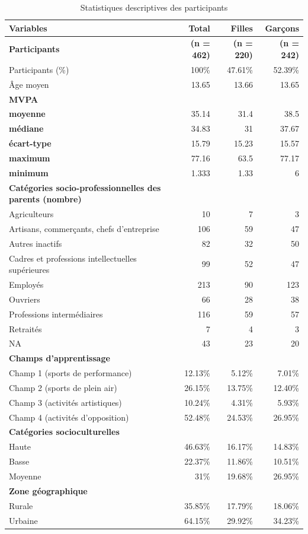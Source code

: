 \documentclass[12pt,a4paper]{article}
\begin{document}
\begin{table}[H]
	\centering
	\caption{Statistiques descriptives des participants}
	\begin{tabular}{lrrr}
		\toprule
		\textbf{Variables} & \textbf{Total} & \textbf{Filles} & \textbf{Garçons} \\
		\midrule
		\textbf{Participants} & \textbf{(n = 462)} & \textbf{(n = 220)} & \textbf{(n = 242)} \\
		Participants (\%) & 100\% & 47.61\% & 52.39\%\\
		Âge moyen & 13.65 & 13.66 & 13.65 \\
		\midrule
		\textbf{MVPA}\\
		\textbf{moyenne} & 35.14 & 31.4 & 38.5\\
		\textbf{médiane} & 34.83 & 31 & 37.67\\
		\textbf{écart-type} & 15.79 &  15.23& 15.57 \\
		\textbf{maximum} & 77.16 & 63.5 & 77.17 \\
		\textbf{minimum} &1.333 & 1.33 & 6\\
		\midrule
		\textbf{Catégories socio-professionnelles des parents (nombre)} \\
		Agriculteurs & 10 & 7 & 3 \\
		Artisans, commerçants, chefs d'entreprise & 106 & 59 & 47 \\
		Autres inactifs & 82 & 32 & 50 \\
		Cadres et professions intellectuelles supérieures & 99 & 52 & 47 \\
		Employés & 213 & 90 & 123 \\
		Ouvriers & 66 & 28 & 38 \\
		Professions intermédiaires & 116 & 59 & 57 \\
		Retraités & 7 & 4 & 3 \\
		NA & 43 & 23 & 20 \\
		\midrule
		\textbf{Champs d'apprentissage} \\
		Champ 1 (sports de performance) & 12.13\% & 5.12\% & 7.01\% \\
		Champ 2 (sports de plein air) & 26.15\% & 13.75\% & 12.40\% \\
		Champ 3 (activités artistiques) & 10.24\% & 4.31\% & 5.93\% \\
		Champ 4 (activités d'opposition) & 52.48\% & 24.53\% & 26.95\% \\
		\midrule
		\textbf{Catégories socioculturelles} \\
		Haute & 46.63\% & 16.17\% & 14.83\% \\
		Basse & 22.37\% & 11.86\% & 10.51\% \\
		Moyenne & 31\% & 19.68\% & 26.95\% \\
		\midrule
		\textbf{Zone géographique} \\
		Rurale & 35.85\% & 17.79\% & 18.06\% \\
		Urbaine & 64.15\% & 29.92\% & 34.23\% \\
		\bottomrule
	\end{tabular}
	\label{tab:descriptive_stats}
\end{table}
\end{document}
